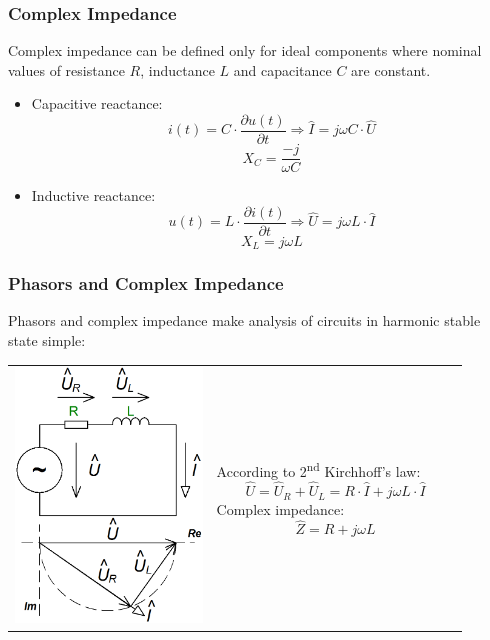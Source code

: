 \documentclass{beamer}
\begin{document}
	\begin{frame}
    \frametitle{Complex Impedance}
		Complex impedance can be defined only for ideal components where nominal values of resistance $R$, inductance $L$ and capacitance $C$ are constant.
		
		\begin{itemize}
			\item Capacitive reactance: $$i(t)= C\cdot\frac{\partial u(t)}{\partial t}\Longrightarrow \hat{I}=j\omega C\cdot\hat{U}$$ $$X_C=\frac{-j}{\omega C}$$
			\item Inductive reactance: $$u(t)= L\cdot\frac{\partial i(t)}{\partial t}\Longrightarrow \hat{U}=j\omega L\cdot\hat{I}$$ $$X_L=j\omega L$$
		\end{itemize}
	\end{frame}
	\begin{frame}
    \frametitle{Phasors and Complex Impedance}
		Phasors and complex impedance make analysis of circuits in harmonic stable state simple:
		\begin{center}
			\begin{tabular}{m{0.4\linewidth} m{0.5\linewidth}}
			\includegraphics[scale=0.25]{obr01_RLobvod.png} &
			According to 2\textsuperscript{nd} Kirchhoff's law:
			$$\hat{U}=\hat{U}_R + \hat{U}_L = R\cdot\hat{I}+j\omega L\cdot\hat{I}$$
			Complex impedance:
			$$\hat{Z}=R+j\omega L$$
			\end{tabular}
		\end{center}
	\end{frame}
\end{document}

